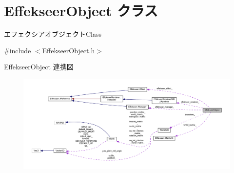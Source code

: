 \hypertarget{class_effekseer_object}{}\section{Effekseer\+Object クラス}
\label{class_effekseer_object}


エフェクシアオブジェクト\+Class  




{\ttfamily \#include $<$Effekseer\+Object.\+h$>$}



Effekseer\+Object 連携図\nopagebreak
\begin{figure}[H]
\begin{center}
\leavevmode
\includegraphics[width=350pt]{class_effekseer_object__coll__graph}
\end{center}
\end{figure}
